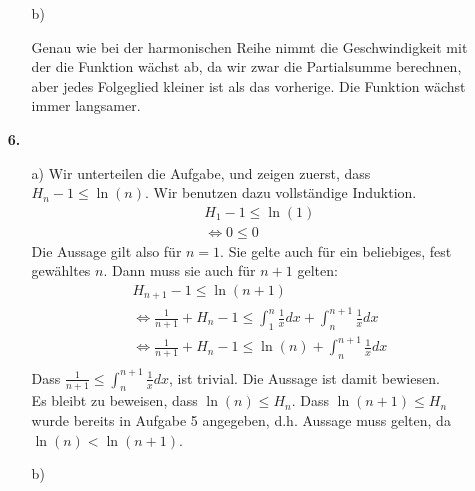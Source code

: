 \documentclass[a4paper,11pt]{article}
\begin{document}
\begin{enumerate}
\begin{enumerate}
                \item[b)]

                Genau wie bei der harmonischen Reihe nimmt die Geschwindigkeit mit der die Funktion wächst ab,
                da wir zwar die Partialsumme berechnen, aber jedes Folgeglied kleiner ist als das vorherige.
                Die Funktion wächst immer langsamer.

            \end{enumerate}

        \item[\textbf{6.}]
            \begin{enumerate}
                \item[a)]
                Wir unterteilen die Aufgabe, und zeigen zuerst, dass $H_n - 1 \leq \ln(n)$. Wir benutzen dazu vollständige Induktion.
                \begin{align*}
                    H_1 - 1 \leq \ln(1)\\
                    \Leftrightarrow 0 \leq 0
                \end{align*}
                Die Aussage gilt also für $n=1$. Sie gelte auch für ein beliebiges, fest gewähltes $n$.
                Dann muss sie auch für $n+1$ gelten:
                \begin{align*}
                    H_{n+1} - 1 \leq \ln(n+1)\\
                    \Leftrightarrow \frac{1}{n+1} + H_n - 1 \leq \int_1^n \frac{1}{x}dx + \int_n^{n+1} \frac{1}{x}dx\\
                    \Leftrightarrow \frac{1}{n+1} + H_n - 1 \leq \ln(n) + \int_n^{n+1} \frac{1}{x}dx\\
                \end{align*}
                Dass $\frac{1}{n+1} \leq \int_n^{n+1} \frac{1}{x}dx$, ist trivial. Die Aussage ist damit bewiesen.\\
                Es bleibt zu beweisen, dass $\ln(n) \leq H_n$. Dass $\ln(n+1) \leq H_n$ wurde bereits in Aufgabe 5 angegeben, d.h.
                Aussage muss gelten, da $\ln(n) < \ln(n+1)$.
                \item[b)]


            \end{enumerate}

    \end{enumerate}
\end{document}
